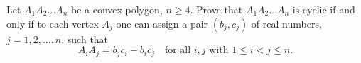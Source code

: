 Let $A_1 A_2 \dots A_n$ be a convex polygon, $n \geq 4$. Prove that $A_1 A_2 \dots A_n$ is cyclic if and only if to each vertex $A_j$ one can assign a pair $(b_j, c_j)$ of real numbers, $j = 1, 2, \dots, n$, such that
\[ A_i A_j = b_j c_i - b_i c_j \quad \text{for all } i, j \text{ with } 1 \leq i < j \leq n. \]
